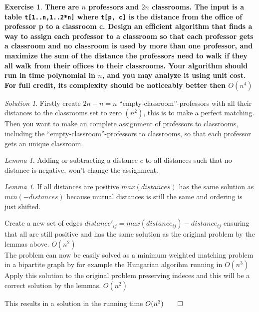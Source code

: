 \documentclass[a4paper,twoside=false,abstract=false,numbers=noenddot,
titlepage=false,headings=small,parskip=half,version=last]{scrartcl}
\theoremstyle{definition}
\newtheorem{exercise}{Exercise}
\theoremstyle{remark}
\newtheorem*{solution}{Solution}
\newtheorem{lemma}[theorem]{Lemma}
\begin{document}
\begin{exercise}
{\bf
There are $n$ professors and $2n$ classrooms. The input is a table \verb+t[1..n,1..2*n]+ where \verb+t[p, c]+ is the distance from the office of professor p to a classroom c.
Design an efficient algorithm that finds a way to assign each professor to a classroom so that each professor gets a classroom and no classroom is used by more than one professor, and maximize the sum of the distance the professors need to walk if they all walk from their offices to their classrooms.
Your algorithm should run in time polynomial in $n$, and you may analyze it using unit cost.
For full credit, its complexity should be noticeably better then $O(n^4)$
}
\end{exercise}
\begin{solution}
Firstly create $2n-n=n$ ``empty-classroom''-professors with all their distances
to the classrooms set to zero $(n^2)$, this is to make a perfect matching.
Then you want to make an complete assignment of professors to classrooms,
including the ``empty-classroom''-professors to classrooms, 
so that each professor gets an unique classroom.\\
\begin{lemma}
Adding or subtracting a distance $c$ to all distances such that no distance is
negative, won't change the assignment.\\
\end{lemma}
\begin{lemma}
If all distances are positive $max(distances)$ has the same solution as
$min(-distances)$ because mutual distances is still the same and ordering is
just shifted.\\
\end{lemma}
Create a new set of edges $distance'_{ij} = max(distance_{ij})-distance_{ij}$ ensuring that all
are still positive and has the same solution as the original problem by the
lemmas above. $O(n^2)$\\

The problem can now be easily solved as a minimum weighted matching problem in
a bipartite graph by for example the Hungarian algorihm running in $O(n^3)$\\

Apply this solution to the original problem preserving indeces and this will be
a correct solution by the lemmas. $O(n^2)$

This results in a solution in the running time $O(n^3) \qed$
\end{solution}
\end{document}
